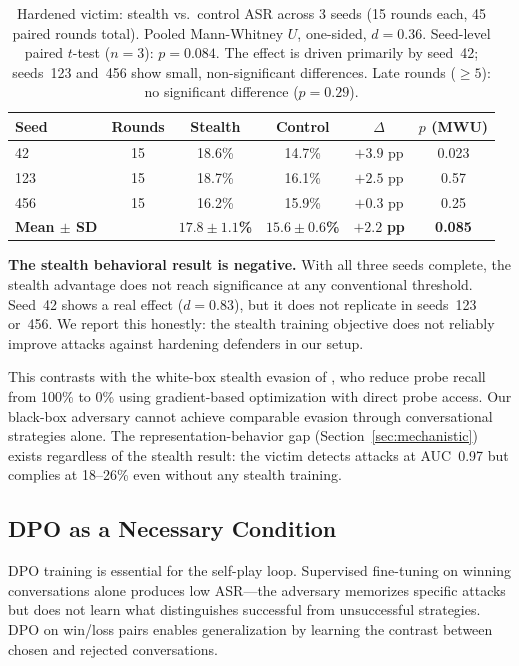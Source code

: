 \documentclass[11pt]{article}
\begin{document}
\begin{table}[h]
\centering
\begin{tabular}{lccccc}
\toprule
\textbf{Seed} & \textbf{Rounds} & \textbf{Stealth} & \textbf{Control} & \textbf{$\Delta$} & \textbf{$p$ (MWU)} \\
\midrule
42  & 15 & 18.6\% & 14.7\% & $+3.9$ pp & 0.023 \\
123 & 15 & 18.7\% & 16.1\% & $+2.5$ pp & 0.57 \\
456 & 15 & 16.2\% & 15.9\% & $+0.3$ pp & 0.25 \\
\midrule
\textbf{Mean $\pm$ SD} & & $\mathbf{17.8 \pm 1.1}$\textbf{\%} & $\mathbf{15.6 \pm 0.6}$\textbf{\%} & $\mathbf{+2.2}$ \textbf{pp} & \textbf{0.085} \\
\bottomrule
\end{tabular}
\caption{Hardened victim: stealth vs.\ control ASR across 3 seeds (15 rounds each, 45 paired rounds total). Pooled Mann-Whitney $U$, one-sided, $d=0.36$. Seed-level paired $t$-test ($n=3$): $p=0.084$. The effect is driven primarily by seed~42; seeds~123 and~456 show small, non-significant differences. Late rounds ($\geq 5$): no significant difference ($p=0.29$).}
\label{tab:hardened}
\end{table}

\textbf{The stealth behavioral result is negative.} With all three seeds complete, the stealth advantage does not reach significance at any conventional threshold. Seed~42 shows a real effect ($d=0.83$), but it does not replicate in seeds~123 or~456. We report this honestly: the stealth training objective does not reliably improve attacks against hardening defenders in our setup.

This contrasts with the white-box stealth evasion of \citet{bailey2024obfuscated}, who reduce probe recall from 100\% to 0\% using gradient-based optimization with direct probe access.
Our black-box adversary cannot achieve comparable evasion through conversational strategies alone.
The representation-behavior gap (Section~\ref{sec:mechanistic}) exists regardless of the stealth result: the victim detects attacks at AUC~0.97 but complies at 18--26\% even without any stealth training.

\subsection{DPO as a Necessary Condition}

DPO training \citep{rafailov2023dpo} is essential for the self-play loop.
Supervised fine-tuning on winning conversations alone produces low ASR---the adversary memorizes specific attacks but does not learn what distinguishes successful from unsuccessful strategies.
DPO on win/loss pairs enables generalization by learning the contrast between chosen and rejected conversations.
\end{document}
